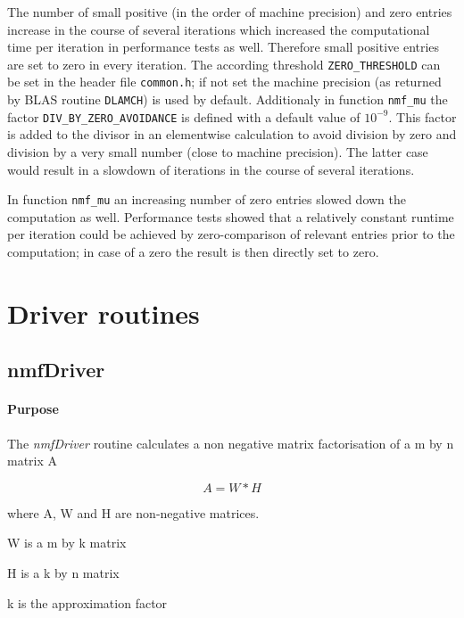\documentclass[a4paper,10pt]{scrartcl}
\begin{document}
	The number of small positive (in the order of machine precision) and zero entries increase in the course of several iterations
	which increased the computational time per iteration in performance tests as well.
	Therefore small positive entries are set to zero in every iteration. The according threshold \texttt{ZERO\_THRESHOLD} can be set in the header file \texttt{common.h}; if not set the machine precision (as returned by BLAS routine \texttt{DLAMCH}) is used by default.
	Additionaly in function \texttt{nmf\_mu} the factor \texttt{DIV\_BY\_ZERO\_AVOIDANCE} is defined with a default value of $10^{-9}$. This factor is added to the divisor in an elementwise calculation to avoid division by zero and division by a very small number (close to machine precision). The latter case would result in a slowdown of iterations in the course of several iterations.

	In function \texttt{nmf\_mu} an increasing number of zero entries slowed down the computation as well. Performance tests showed that a relatively
	constant runtime per iteration could be achieved by zero-comparison of relevant entries prior to the computation; in case of a zero the result is then directly set to zero.	
	

	\section{Driver routines} 	

		\subsection{nmfDriver}

			\paragraph{Purpose}

					The \emph{nmfDriver} routine calculates a non negative matrix factorisation
					of a m by n matrix A
 	
					\begin{equation*}
 					A = W * H
					\end{equation*} 

 					where A, W and H are non-negative matrices.

					W is a m by k matrix

 					H is a k by n matrix

 					k is the approximation factor\newline
\end{document}
